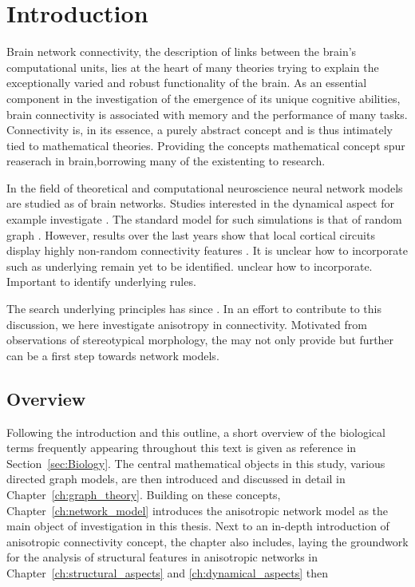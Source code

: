 \chapter{Introduction}\label{ch:Introduction} 

Brain network connectivity, the description of links between the
brain's computational units, lies at the heart of many theories trying
to explain the exceptionally varied and robust functionality of the
brain. As an essential component in the investigation of the emergence
of its unique cognitive abilities, brain connectivity is associated
with memory and the performance of many tasks. Connectivity is, in its
essence, a purely abstract concept and is thus intimately tied to
mathematical theories. Providing the concepts mathematical concept
spur reaserach in brain,borrowing many of the existenting to research.

In the field of theoretical and computational neuroscience neural
network models are studied as of brain networks. Studies interested in
the dynamical aspect for example investigate . The standard model for
such simulations is that of random
graph \parencite{Brunel2000}. However, results over the last years
show that local cortical circuits display highly non-random
connectivity features \parencite{Song2005, Perin2011}. It is unclear
how to incorporate such as underlying remain yet to be identified.
unclear how to incorporate. Important to identify underlying rules.

The search underlying principles has
since \parencite{Klinshov2014}. In an effort to contribute to this
discussion, we here investigate anisotropy in connectivity. Motivated
from observations of stereotypical morphology, the may not only
provide but further can be a first step towards network models.

\section{Overview}\label{sec:all_overview}

Following the introduction and this outline, a short overview of the
biological terms frequently appearing throughout this text is given as
reference in Section~\ref{sec:Biology}. The central mathematical
objects in this study, various directed graph models, are then
introduced and discussed in detail in
Chapter~\ref{ch:graph_theory}. Building on these concepts,
Chapter~\ref{ch:network_model} introduces the anisotropic network
model as the main object of investigation in this thesis. Next to an
in-depth introduction of anisotropic connectivity concept, the chapter
also includes, laying the groundwork for the analysis of structural
features in anisotropic networks in
Chapter~\ref{ch:structural_aspects} and \ref{ch:dynamical_aspects}
then



